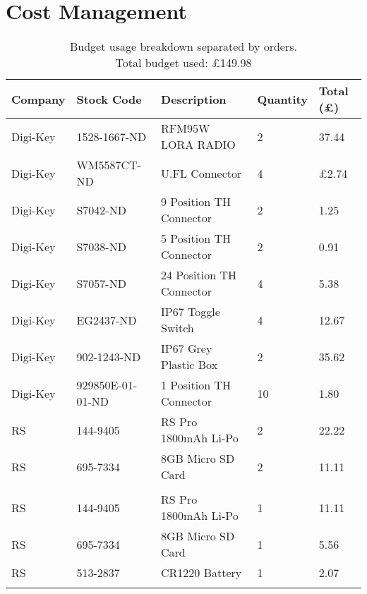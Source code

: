 \chapter{Cost Management}
\begin{table}[H]
\centering\small
\caption[Budget usage breakdown]{Budget usage breakdown separated by orders. \\ Total budget used: \pounds149.98}
\label{fig:budget_breakdown}
\begin{tabular}{p{2cm}|p{3.5cm}|p{5cm}|p{2cm}|p{2cm}}
\toprule
\textbf{Company} & \textbf{Stock Code} & \textbf{Description} & \textbf{Quantity} & \textbf{Total (\pounds)} \\
\midrule
Digi-Key & 1528-1667-ND & RFM95W LORA RADIO & 2 & 37.44 \\
Digi-Key & WM5587CT-ND &  U.FL Connector & 4 & £2.74 \\
\addlinespace\addlinespace
Digi-Key & S7042-ND & 9 Position TH Connector & 2 & 1.25 \\
Digi-Key & S7038-ND & 5 Position TH Connector & 2 & 0.91 \\
Digi-Key & S7057-ND & 24 Position TH Connector & 4 & 5.38 \\
Digi-Key & EG2437-ND & IP67 Toggle Switch & 4 & 12.67 \\
Digi-Key & 902-1243-ND & IP67 Grey Plastic Box & 2 & 35.62 \\
Digi-Key & 929850E-01-01-ND & 1 Position TH Connector & 10 & 1.80 \\
\addlinespace\addlinespace
RS & 144-9405 & RS Pro 1800mAh Li-Po & 2 & 22.22 \\
RS & 695-7334 & 8GB Micro SD Card & 2 & 11.11 \\
\addlinespace\addlinespace
\multicolumn{5}{l}{\textit{Spares Order}} \\
RS & 144-9405 & RS Pro 1800mAh Li-Po & 1 & 11.11 \\
RS & 695-7334 & 8GB Micro SD Card & 1 & 5.56 \\
RS & 513-2837 & CR1220 Battery	& 1 & 2.07 \\
\addlinespace\bottomrule
\end{tabular}
\end{table}


